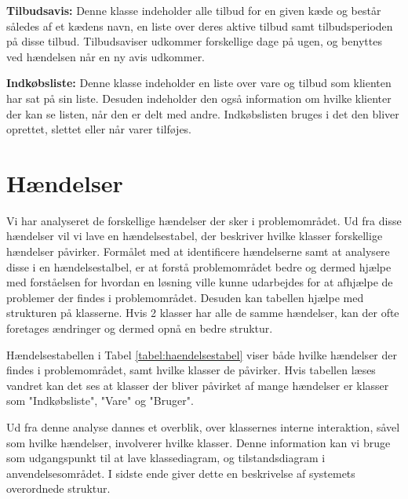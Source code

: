 \textbf{Tilbudsavis:}
Denne klasse indeholder alle tilbud for en given kæde og består således af et kædens navn, en liste over deres aktive tilbud samt tilbudsperioden på disse tilbud. Tilbudsaviser udkommer forskellige dage på ugen, og benyttes ved hændelsen når en ny avis udkommer.

\textbf{Indkøbsliste:}
Denne klasse indeholder en liste over vare og tilbud som klienten har sat på sin liste. Desuden indeholder den også information om hvilke klienter der kan se listen, når den er delt med andre. Indkøbslisten bruges i det den bliver oprettet, slettet eller når varer tilføjes.


\section{Hændelser}
Vi har analyseret de forskellige hændelser der sker i problemområdet.   
Ud fra disse hændelser vil vi lave en hændelsestabel, der beskriver hvilke klasser forskellige hændelser påvirker.
Formålet med at identificere hændelserne samt at analysere disse i en hændelsestalbel, er at forstå problemområdet bedre og dermed hjælpe med forståelsen for hvordan en løsning ville kunne udarbejdes for at afhjælpe de problemer der findes i problemområdet. Desuden kan tabellen hjælpe med strukturen på klasserne. 
Hvis 2 klasser har alle de samme hændelser, kan der ofte foretages ændringer og dermed opnå en bedre struktur.



Hændelsestabellen i Tabel \ref{tabel:haendelsestabel} viser både hvilke hændelser der findes i problemområdet, samt hvilke klasser de påvirker.
Hvis tabellen læses vandret kan det ses at klasser der bliver påvirket af mange hændelser er klasser som "Indkøbsliste", "Vare" og "Bruger".


Ud fra denne analyse dannes et overblik, over klassernes interne interaktion, såvel som hvilke hændelser, involverer hvilke klasser.
Denne information kan vi bruge som udgangspunkt til at lave klassediagram, og tilstandsdiagram i anvendelsesområdet.
I sidste ende giver dette en beskrivelse af systemets overordnede struktur.